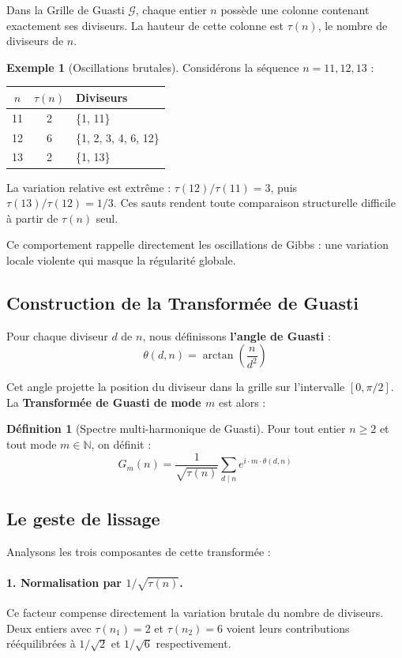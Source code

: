 \documentclass[12pt,a4paper]{article}
\theoremstyle{definition}
\newtheorem{definition}{Définition}[section]
\newtheorem{example}{Exemple}[section]
\theoremstyle{remark}
\newcommand{\GrilleG}{\mathcal{G}}           %
\newcommand{\Gm}[2]{G_{#1}(#2)}              %
\newcommand{\thetaG}[2]{\theta(#1,#2)}       %
\DeclareMathOperator{\arctan}{arctan}
\newcommand{\N}{\mathbb{N}}
\begin{document}
Dans la Grille de Guasti $\GrilleG$, chaque entier $n$ possède une colonne contenant exactement ses diviseurs. La hauteur de cette colonne est $\tau(n)$, le nombre de diviseurs de $n$.

\begin{example}[Oscillations brutales]
Considérons la séquence $n = 11, 12, 13$ :
\begin{center}
\begin{tabular}{c|c|l}
$n$ & $\tau(n)$ & Diviseurs \\
\hline
11 & 2 & \{1, 11\} \\
12 & 6 & \{1, 2, 3, 4, 6, 12\} \\
13 & 2 & \{1, 13\}
\end{tabular}
\end{center}

La variation relative est extrême : $\tau(12)/\tau(11) = 3$, puis $\tau(13)/\tau(12) = 1/3$. Ces sauts rendent toute comparaison structurelle difficile à partir de $\tau(n)$ seul.
\end{example}

Ce comportement rappelle directement les oscillations de Gibbs : une variation locale violente qui masque la régularité globale.

\subsection{Construction de la Transformée de Guasti}

Pour chaque diviseur $d$ de $n$, nous définissons \textbf{l'angle de Guasti} :
\[
\thetaG{d}{n} = \arctan\left(\frac{n}{d^2}\right)
\]

Cet angle projette la position du diviseur dans la grille sur l'intervalle $[0, \pi/2]$. La \textbf{Transformée de Guasti de mode $m$} est alors :

\begin{definition}[Spectre multi-harmonique de Guasti]
Pour tout entier $n \geq 2$ et tout mode $m \in \N$, on définit :
\[
\Gm{m}{n} = \frac{1}{\sqrt{\tau(n)}} \sum_{d \mid n} e^{i \cdot m \cdot \thetaG{d}{n}}
\]
\end{definition}

\subsection{Le geste de lissage}

Analysons les trois composantes de cette transformée :

\paragraph{1. Normalisation par $1/\sqrt{\tau(n)}$.}
Ce facteur compense directement la variation brutale du nombre de diviseurs. Deux entiers avec $\tau(n_1) = 2$ et $\tau(n_2) = 6$ voient leurs contributions rééquilibrées à $1/\sqrt{2}$ et $1/\sqrt{6}$ respectivement.
\end{document}
